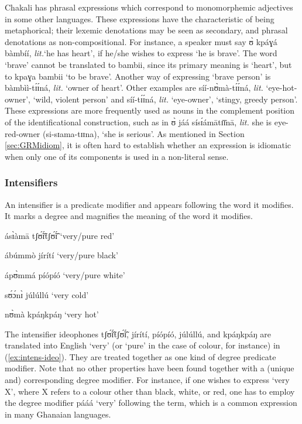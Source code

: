 \begin{exe}
\begin{exe}
\begin{exe}
\begin{exe}
\begin{exe}
\begin{exe}
\begin{exe}
\begin{exe}
\begin{exe}
Chakali has phrasal expressions which correspond to  monomorphemic adjectives in some other languages. These expressions have the characteristic of being metaphorical; their lexemic denotations may be seen as secondary, and phrasal  denotations as non-compositional. For instance, a speaker must say {\sls ʊ̀ kpáɣá bàmbíí}, {\it lit.}`he has heart', if he/she wishes to express `he is brave'. The word `brave' cannot be translated to {\sls bambii}, since its primary meaning is `heart',  but to {\sls kpaɣa bambii}  `to be brave'. Another way of expressing `brave person'  is {\sls bàmbìì-tɪ́ɪ́ná}, {\it lit.} `owner of heart'. Other examples  are {\sls síí-nʊ̀mà-tɪ́ɪ́ná}, {\it lit.} `eye-hot-owner', `wild, violent  person'   and {\sls síí-tɪ́ɪ́ná}, {\it lit.} `eye-owner', `stingy, greedy person'. These expressions are more frequently used as nouns in the complement position of the identificational construction, such as in {\sls ʊ̀ jáá sísɪ́ámātɪ̄ɪ̄nā}, {\it lit.} she is eye-red-owner  ({\sls si-sɪama-tɪɪna}), `she is serious'. As mentioned in Section \ref{sec:GRMidiom},  it is often hard to establish whether an expression is idiomatic when only one of its components is used in a non-literal sense.



\subsubsection{Intensifiers}
\label{sec:GRM-intensifier}

An intensifier is a predicate modifier and appears following the word it modifies. It marks a degree and magnifies the meaning of the word it modifies.

\ea\label{ex:intens-ideo} 
\ea  ásɪ̀àmā tʃʊ̃́ɪ̃́tʃʊ̃́ɪ̃́   {\rm `very/pure  red'}
\label{ex:BCTmod-prop-red}

\ex ábúmmò jírítí {\rm `very/pure black'}
\label{ex:BCTmod-prop-black} 

\ex  ápʊ̀mmá píópíó  {\rm `very/pure  white'}
\label{ex:BCTmod-prop-white}

\ex  sʊ́ɔ́nɪ̀ júlúllú  {\rm `very cold'}
\label{ex:BCTmod-prop-cold}

\ex   nʊ̀mà kpáŋkpáŋ  {\rm `very hot'}
\label{ex:BCTmod-prop-hot}


\z
\z


The  intensifier ideophones  {\sls tʃʊ̃́ɪ̃́tʃʊ̃́ɪ̃́},  {\sls jírítí},  {\sls píópíó},  {\sls júlúllú},  and {\sls kpáŋkpáŋ} are translated into English  `very' (or `pure' in the case of colour, for instance) in (\ref{ex:intens-ideo}). They are treated together as one kind of degree predicate modifier.  Note that no other properties have been found together with a (unique and) corresponding degree modifier. For instance, if one wishes to express `very X', where X refers to a colour other than black, white, or red,   one has to employ the degree modifier {\sls pááá} `very' following the term, which is a common expression in many Ghanaian languages. 


\end{exe}
\end{exe}
\end{exe}
\end{exe}
\end{exe}
\end{exe}
\end{exe}
\end{exe}
\end{exe}
